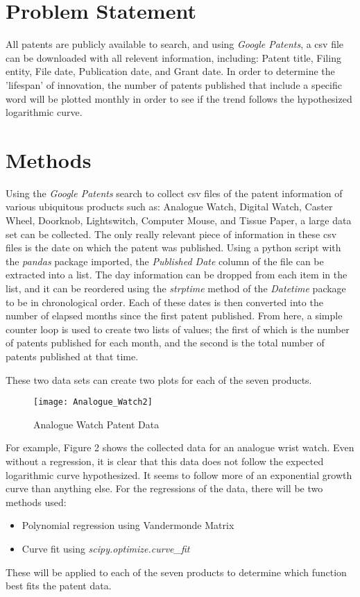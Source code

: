 \documentclass[12pt]{article}
\begin{document}
\section{Problem Statement}\label{Sec_Problem}
\indent All patents are publicly available to search, and using \textit{Google Patents}, a csv file can be downloaded with all relevent information, including: Patent title, Filing entity, File date, Publication date, and Grant date. In order to determine the 'lifespan' of innovation, the number of patents published that include a specific word will be plotted monthly in order to see if the trend follows the hypothesized logarithmic curve.

\section{Methods}\label{Sec_Methods}
\par Using the \textit{Google Patents} search to collect csv files of the patent information of various ubiquitous products such as: Analogue Watch, Digital Watch, Caster Wheel, Doorknob, Lightswitch, Computer Mouse, and Tissue Paper, a large data set can be collected. The only really relevant piece of information in these csv files is the date on which the patent was published. Using a python script with the \textit{pandas} package imported, the \textit{Published Date} column of the file can be extracted into a list. The day information can be dropped from each item in the list, and it can be reordered using the \textit{strptime} method of the \textit{Datetime} package to be in chronological order. Each of these dates is then converted into the number of elapsed months since the first patent published. From here, a simple counter loop is used to create two lists of values; the first of which is the number of patents published for each month, and the second is the total number of patents published at that time.
\par These two data sets can create two plots for each of the seven products.
	\begin{wrapfigure}{l}{0.75\textwidth}
		\texttt{[image: Analogue\_Watch2]}
		\caption{\label{fig2}Analogue Watch Patent Data}
	\end{wrapfigure}
	For example, Figure 2 shows the collected data for an analogue wrist watch. Even without a regression, it is clear that this data does not follow the expected logarithmic curve hypothesized. It seems to follow more of an exponential growth curve than anything else. For the regressions of the data, there will be two methods used:
	\begin{itemize}
		\item Polynomial regression using Vandermonde Matrix
		\item Curve fit using \textit{scipy.optimize.curve\_fit}
	\end{itemize}
	These will be applied to each of the seven products to determine which function best fits the patent data.
	
\end{document}
